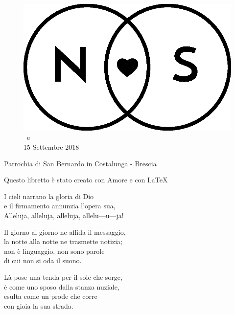 \documentclass[11pt]{book}
\begin{document}

\begin{center}
\begin{figure}
\vspace*{5cm}
\centering
\includegraphics[scale=0.3]{img/Logo_piccolo.eps}
\huge \\ \NSposo \ e \NSposa\\
\large 15 Settembre 2018\\
\end{figure}
\normalsize
{}
Parrochia di San Bernardo in Costalunga - Brescia
\end{center}
\restoregeometry

\newpage\null\thispagestyle{empty}\newpage

\afterpage{\cfoot{\thepage}}
\null\vfill
\begin{center}
{\footnotesize Questo libretto è stato creato con Amore e con \LaTeX}
\end{center}

\newpage\null\thispagestyle{empty}\newpage

\settowidth{\versewidth}{Il giorno al giorno ne affida il messaggio,}
\begin{canzone}%
\begin{ritornello}
I cieli narrano la gloria di Dio\\
e il firmamento annunzia l’opera sua,\\
Alleluja, alleluja, alleluja, allelu—u—ja!
\end{ritornello}

Il giorno al giorno ne affida il messaggio,\\
la notte alla notte ne trasmette notizia;\\
non è linguaggio, non sono parole\\
di cui non si oda il suono.

Là pose una tenda per il sole che sorge,\\
è come uno sposo dalla stanza nuziale,\\
esulta come un prode che corre\\
con gioia la sua strada.
\end{canzone}
\end{document}
